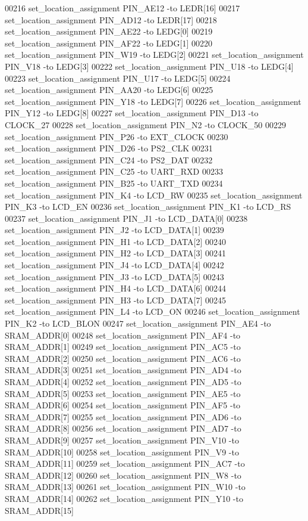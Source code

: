 \begin{DoxyCode}
00216 set\_location\_assignment PIN\_AE12 -to LEDR[16]
00217 set\_location\_assignment PIN\_AD12 -to LEDR[17]
00218 set\_location\_assignment PIN\_AE22 -to LEDG[0]
00219 set\_location\_assignment PIN\_AF22 -to LEDG[1]
00220 set\_location\_assignment PIN\_W19 -to LEDG[2]
00221 set\_location\_assignment PIN\_V18 -to LEDG[3]
00222 set\_location\_assignment PIN\_U18 -to LEDG[4]
00223 set\_location\_assignment PIN\_U17 -to LEDG[5]
00224 set\_location\_assignment PIN\_AA20 -to LEDG[6]
00225 set\_location\_assignment PIN\_Y18 -to LEDG[7]
00226 set\_location\_assignment PIN\_Y12 -to LEDG[8]
00227 set\_location\_assignment PIN\_D13 -to CLOCK\_27
00228 set\_location\_assignment PIN\_N2 -to CLOCK\_50
00229 set\_location\_assignment PIN\_P26 -to EXT\_CLOCK
00230 set\_location\_assignment PIN\_D26 -to PS2\_CLK
00231 set\_location\_assignment PIN\_C24 -to PS2\_DAT
00232 set\_location\_assignment PIN\_C25 -to UART\_RXD
00233 set\_location\_assignment PIN\_B25 -to UART\_TXD
00234 set\_location\_assignment PIN\_K4 -to LCD\_RW
00235 set\_location\_assignment PIN\_K3 -to LCD\_EN
00236 set\_location\_assignment PIN\_K1 -to LCD\_RS
00237 set\_location\_assignment PIN\_J1 -to LCD\_DATA[0]
00238 set\_location\_assignment PIN\_J2 -to LCD\_DATA[1]
00239 set\_location\_assignment PIN\_H1 -to LCD\_DATA[2]
00240 set\_location\_assignment PIN\_H2 -to LCD\_DATA[3]
00241 set\_location\_assignment PIN\_J4 -to LCD\_DATA[4]
00242 set\_location\_assignment PIN\_J3 -to LCD\_DATA[5]
00243 set\_location\_assignment PIN\_H4 -to LCD\_DATA[6]
00244 set\_location\_assignment PIN\_H3 -to LCD\_DATA[7]
00245 set\_location\_assignment PIN\_L4 -to LCD\_ON
00246 set\_location\_assignment PIN\_K2 -to LCD\_BLON
00247 set\_location\_assignment PIN\_AE4 -to SRAM\_ADDR[0]
00248 set\_location\_assignment PIN\_AF4 -to SRAM\_ADDR[1]
00249 set\_location\_assignment PIN\_AC5 -to SRAM\_ADDR[2]
00250 set\_location\_assignment PIN\_AC6 -to SRAM\_ADDR[3]
00251 set\_location\_assignment PIN\_AD4 -to SRAM\_ADDR[4]
00252 set\_location\_assignment PIN\_AD5 -to SRAM\_ADDR[5]
00253 set\_location\_assignment PIN\_AE5 -to SRAM\_ADDR[6]
00254 set\_location\_assignment PIN\_AF5 -to SRAM\_ADDR[7]
00255 set\_location\_assignment PIN\_AD6 -to SRAM\_ADDR[8]
00256 set\_location\_assignment PIN\_AD7 -to SRAM\_ADDR[9]
00257 set\_location\_assignment PIN\_V10 -to SRAM\_ADDR[10]
00258 set\_location\_assignment PIN\_V9 -to SRAM\_ADDR[11]
00259 set\_location\_assignment PIN\_AC7 -to SRAM\_ADDR[12]
00260 set\_location\_assignment PIN\_W8 -to SRAM\_ADDR[13]
00261 set\_location\_assignment PIN\_W10 -to SRAM\_ADDR[14]
00262 set\_location\_assignment PIN\_Y10 -to SRAM\_ADDR[15]

\end{DoxyCode}
